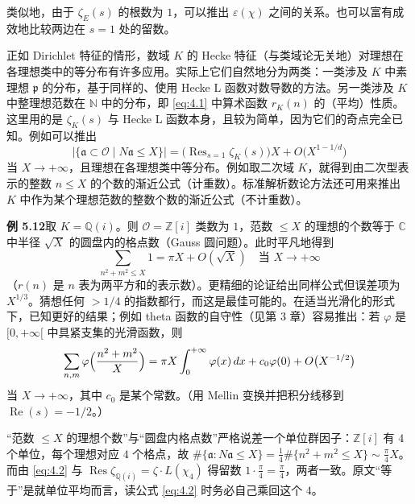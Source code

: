 类似地，由于 $\zeta_E(s)$ 的根数为 $1$，可以推出 $\varepsilon(\chi)$ 之间的关系。也可以富有成效地比较两边在 $s=1$ 处的留数。

正如 Dirichlet 特征的情形，数域 $K$ 的 Hecke 特征（与类域论无关地）对理想在各理想类中的等分布有许多应用。实际上它们自然地分为两类：一类涉及 $K$ 中素理想 $\mathfrak{p}$ 的分布，基于同样的、使用 Hecke L 函数对数导数的方法。另一类涉及 $K$ 中整理想范数在 $\mathbb{N}$ 中的分布，即 \eqref{eq:4.1} 中算术函数 $r_K(n)$ 的（平均）性质。这里用的是 $\zeta_K(s)$ 与 Hecke L 函数本身，且较为简单，因为它们的奇点完全已知。例如可以推出
\[
\bigl|\{\mathfrak{a}\subset\mathcal{O}\mid N\mathfrak{a}\le X\}\bigr|
=\bigl(\operatorname{Res}_{s=1}\zeta_K(s)\bigr)X+O\bigl(X^{1-1/d}\bigr)
\]
当 $X\to+\infty$，且理想在各理想类中等分布。例如取二次域 $K$，就得到由二次型表示的整数 $n\le X$ 的个数的渐近公式（计重数）。标准解析数论方法还可用来推出 $K$ 中作为某个理想范数的整数个数的渐近公式（不计重数）。

\par\medskip\noindent\textbf{例 5.12}\quad 取 $K=\mathbb{Q}(i)$。则 $\mathcal{O}=\mathbb{Z}[i]$ 类数为 $1$，范数 $\le X$ 的理想的个数等于 $\mathbb{C}$ 中半径 $\sqrt{X}$ 的圆盘内的格点数（Gauss 圆问题）。此时平凡地得到
\[
\sum_{n^{2}+m^{2}\le X}1=\pi X+O(\sqrt{X})
\quad\text{当 } X\to+\infty
\]
（$r(n)$ 是 $n$ 表为两平方和的表示数）。更精细的论证给出同样公式但误差项为 $X^{1/3}$。猜想任何 $>1/4$ 的指数都行，而这是最佳可能的。在适当光滑化的形式下，已知更好的结果；例如 theta 函数的自守性（见第 3 章）容易推出：若 $\varphi$ 是 $[0,+\infty[$ 中具紧支集的光滑函数，则
\[
\sum_{n,m}\varphi\Bigl(\frac{n^{2}+m^{2}}{X}\Bigr)
=\pi X\int_{0}^{+\infty}\varphi(x)\,dx+c_0\varphi(0)+O\bigl(X^{-1/2}\bigr)
\]
当 $X\to+\infty$，其中 $c_0$ 是某个常数。（用 Mellin 变换并把积分线移到 $\operatorname{Re}(s)=-1/2$。）

\begin{annote}
“范数 $\le X$ 的理想个数”与“圆盘内格点数”严格说差一个单位群因子：$\mathbb{Z}[i]$ 有 $4$ 个单位，每个理想对应 $4$ 个格点，故
$\#\{\mathfrak{a}:N\mathfrak{a}\le X\}=\tfrac14\#\{n^2+m^2\le X\}\sim\tfrac{\pi}{4}X$。而由 \eqref{eq:4.2} 与 $\operatorname{Res}\zeta_{\mathbb{Q}(i)}=\zeta\cdot L(\chi_4)$ 得留数 $1\cdot\tfrac{\pi}{4}=\tfrac{\pi}{4}$，两者一致。原文“等于”是就单位平均而言，读公式 \eqref{eq:4.2} 时务必自己乘回这个 $4$。
\par\vspace{0.15em}{\raggedleft 【来源：原书 (4.2) 与 (5.3) 的数值自洽核对（I）；Iwaniec--Kowalski 前引书 Gauss 圆问题一节（A）】\par}
\end{annote}

